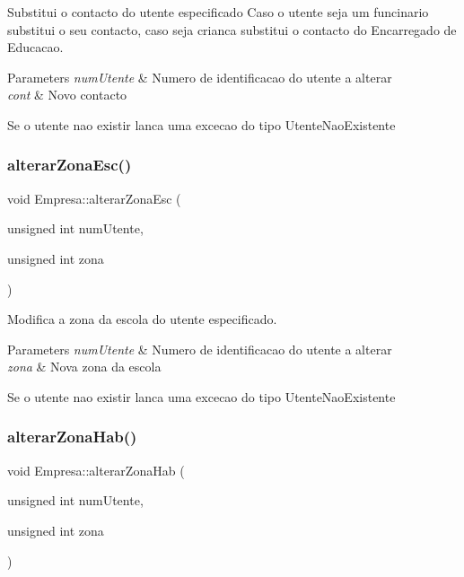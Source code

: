 Substitui o contacto do utente especificado Caso o utente seja um funcinario substitui o seu contacto, caso seja crianca substitui o contacto do Encarregado de Educacao. 


\begin{DoxyParams}{Parameters}
{\em num\+Utente} & Numero de identificacao do utente a alterar \\
\hline
{\em cont} & Novo contacto\\
\hline
\end{DoxyParams}
Se o utente nao existir lanca uma excecao do tipo Utente\+Nao\+Existente \mbox{\label{class_empresa_a87c4477cee0f0889942804ba69dd0791}} 
\subsubsection{\texorpdfstring{alterar\+Zona\+Esc()}{alterarZonaEsc()}}
{\footnotesize\ttfamily void Empresa\+::alterar\+Zona\+Esc (\begin{DoxyParamCaption}\item[{unsigned int}]{num\+Utente,  }\item[{unsigned int}]{zona }\end{DoxyParamCaption})}



Modifica a zona da escola do utente especificado. 


\begin{DoxyParams}{Parameters}
{\em num\+Utente} & Numero de identificacao do utente a alterar \\
\hline
{\em zona} & Nova zona da escola\\
\hline
\end{DoxyParams}
Se o utente nao existir lanca uma excecao do tipo Utente\+Nao\+Existente \mbox{\label{class_empresa_a90633274606d1983946d53523ed3eaa4}} 
\subsubsection{\texorpdfstring{alterar\+Zona\+Hab()}{alterarZonaHab()}}
{\footnotesize\ttfamily void Empresa\+::alterar\+Zona\+Hab (\begin{DoxyParamCaption}\item[{unsigned int}]{num\+Utente,  }\item[{unsigned int}]{zona }\end{DoxyParamCaption})}



